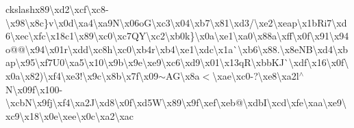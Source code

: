 \begin{DoxyCompactItemize}
ckslash{}x89\textbackslash{}xd2\textbackslash{}xcf\textbackslash{}xc8-\/\textbackslash{}x98\textbackslash{}x8c\}v\textbackslash{}x0d\textbackslash{}xa4\textbackslash{}xa9\+N\textbackslash{}x06o\+G\textbackslash{}xc3\textbackslash{}x04\textbackslash{}xb7\textbackslash{}x81\textbackslash{}xd3/\textbackslash{}xe2\textbackslash{}xeap\textbackslash{}x1b\+Ri7\textbackslash{}xd6\textbackslash{}xec\textbackslash{}xfc\textbackslash{}x18c1\textbackslash{}x89\textbackslash{}xc0\textbackslash{}xc7\+Q\+Y\textbackslash{}xc2\textbackslash{}xb0k\}\textbackslash{}x0a\textbackslash{}xe1\textbackslash{}xa0\textbackslash{}x88a\textbackslash{}xff\textbackslash{}x0f\textbackslash{}x91\textbackslash{}x94o@@\textbackslash{}x94\textbackslash{}x01r\textbackslash{}xdd\textbackslash{}xc8h\textbackslash{}xc0\textbackslash{}xb4r\textbackslash{}xb4\textbackslash{}xe1\textbackslash{}xdc\textbackslash{}x1a\`{}\textbackslash{}xb6\textbackslash{}x88.\textbackslash{}x8e\+N\+B\textbackslash{}xd4\textbackslash{}xbap\textbackslash{}x95\textbackslash{}xf7\+U0\textbackslash{}xa5\textbackslash{}x10\textbackslash{}x9b\textbackslash{}x9e\textbackslash{}xe9\textbackslash{}xc6\textbackslash{}xd9\textbackslash{}x01\textbackslash{}x13q\+R\textbackslash{}xbb\+K\+J\`{}\textbackslash{}xdf\textbackslash{}x16\textbackslash{}x0f\textbackslash{}x0a\textbackslash{}x82)\textbackslash{}xf4\textbackslash{}xe3!\textbackslash{}x9c\textbackslash{}x8b\textbackslash{}x7f\textbackslash{}x09$\sim$\+A\+G\textbackslash{}x8a$<$\textbackslash{}xae\textquotesingle{}\textbackslash{}xc0-\/?\textbackslash{}xe8\textbackslash{}xa2l$^\wedge$\+N\textbackslash{}x09f\textbackslash{}x100-\/\textbackslash{}xcb\+N\textbackslash{}x9fj\textbackslash{}xf4\textbackslash{}xa2\+J\textbackslash{}xd8\textbackslash{}x0f\textbackslash{}xd5\+W\textbackslash{}x89\textbackslash{}x9f\textbackslash{}xef\textbackslash{}xeb@\textbackslash{}xdb\+I\textbackslash{}xcd\textbackslash{}xfe\textbackslash{}xaa\textbackslash{}xe9\textbackslash{}xc9\textbackslash{}x18\textbackslash{}x0e\textbackslash{}xee\textbackslash{}x0c\textbackslash{}xa2\textbackslash{}xac 
\end{DoxyCompactItemize}
